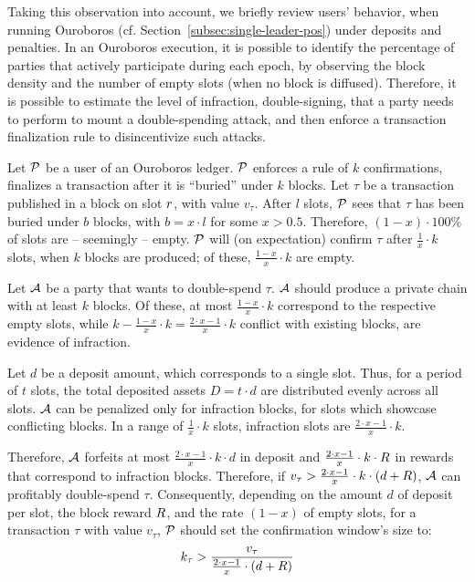 Taking this observation into account, we briefly review users' behavior, when
running Ouroboros (cf.  Section~\ref{subsec:single-leader-pos}) under deposits
and penalties. In an Ouroboros execution, it is possible to identify the
percentage of parties that actively participate during each epoch, by observing
the block density and the number of empty slots (\ie when no block is
diffused). Therefore, it is possible to estimate the level of infraction, \ie
double-signing, that a party needs to perform to mount a double-spending
attack, and then enforce a transaction finalization rule to disincentivize
such attacks.

Let $\mathcal{P}$ be a user of an Ouroboros ledger. $\mathcal{P}$ enforces
a rule of $k$ confirmations, \ie finalizes a transaction after it is
``buried'' under $k$ blocks. Let $\tau$ be a transaction published in a block
on slot $r$, with value $v_\tau$. After $l$ slots, $\mathcal{P}$ sees that
$\tau$ has been buried under $b$ blocks, with $b = x \cdot l$ for some $x > 0.5$. Therefore, $(1 -
x) \cdot 100$\% of slots are -- seemingly -- empty. $\mathcal{P}$ will (on expectation)
confirm $\tau$ after $\frac{1}{x} \cdot k$ slots, \ie when $k$
blocks are produced; of these, $\frac{1 - x}{x} \cdot k$ are empty.

Let $\mathcal{A}$ be a party that wants to double-spend $\tau$.
$\mathcal{A}$ should produce a private chain with at least $k$ blocks. Of these,
at most $\frac{1 - x}{x} \cdot k$ correspond to the respective empty slots,
while $k - \frac{1 - x}{x} \cdot k = \frac{2 \cdot x - 1}{x} \cdot k$ conflict
with existing blocks, \ie are evidence of infraction.

Let $d$ be a deposit amount, which corresponds to a single slot. Thus, for a
period of $t$ slots, the total deposited assets $D = t \cdot d$ are distributed evenly
across all slots.
$\mathcal{A}$ can be penalized only for infraction blocks, \ie for
slots which showcase conflicting blocks. In a range of $\frac{1}{x} \cdot k$ slots, infraction slots are $\frac{2 \cdot x - 1}{x} \cdot k$.

Therefore, $\mathcal{A}$ forfeits at most $\frac{2 \cdot x - 1}{x} \cdot k \cdot
d$ in deposit and $\frac{2 \cdot x - 1}{x} \cdot k \cdot R$ in rewards
that correspond to infraction blocks.
Therefore, if $v_\tau > \frac{2 \cdot x - 1}{x} \cdot k \cdot (d + R)$,
$\mathcal{A}$ can profitably double-spend $\tau$.
Consequently, depending on the amount $d$ of deposit per slot, the block reward
$R$, and the rate $(1 - x)$ of empty slots, for a transaction $\tau$ with
value $v_\tau$, $\mathcal{P}$ should set the confirmation window's size to:
\begin{align}
    k_\tau > \frac{v_\tau}{\frac{2 \cdot x - 1}{x} \cdot (d + R)}
\end{align}

